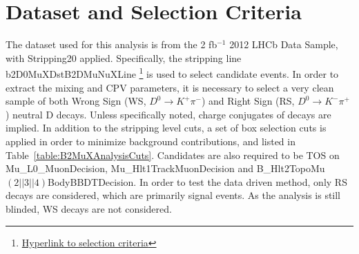 \section{Dataset and Selection Criteria}
\label{sec:Dataset-and-Selection-Criteria}
The dataset used for this analysis is from the 2 fb$^{-1}$ 2012 LHCb Data Sample, with 
Stripping20 applied. Specifically, the stripping line b2D0MuXDstB2DMuNuXLine
\footnote{\href{http://lhcb-release-area.web.cern.ch/LHCb-release-area/DOC/stripping/config/stripping20/semileptonic/strippingb2d0muxdstb2dmunuxline.html}{Hyperlink to selection criteria}} is used 
to select candidate events. In order to extract the mixing and CPV 
parameters, it is necessary to select a very clean sample of both Wrong Sign 
(WS, $D^0\to K^+\pi^-$) and Right Sign (RS, $D^0\to K^-\pi^+$) neutral D decays. Unless specifically 
noted, charge conjugates of decays are implied. In addition to the stripping level cuts, 
a set of box selection cuts is applied in order to minimize background contributions, 
and listed in Table~\ref{table:B2MuXAnalysisCuts}. Candidates are also required
to be TOS on Mu\_L0\_MuonDecision, Mu\_Hlt1TrackMuonDecision and 
B\_Hlt2TopoMu$(2||3||4)$BodyBBDTDecision. In order to test the data driven 
method, only RS decays are considered, which are primarily signal events. As the 
analysis is still blinded, WS decays are not considered.
